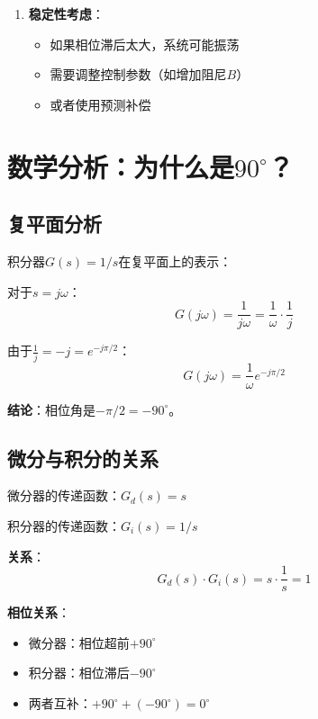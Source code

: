 \documentclass[12pt,a4paper]{article}
\begin{document}
\begin{enumerate}
\begin{enumerate}
\item \textbf{稳定性考虑}：
\begin{itemize}
\item 如果相位滞后太大，系统可能振荡
\item 需要调整控制参数（如增加阻尼$B$）
\item 或者使用预测补偿
\end{itemize}
\end{enumerate}

\section{数学分析：为什么是$90^\circ$？}

\subsection{复平面分析}

积分器$G(s) = 1/s$在复平面上的表示：

对于$s = j\omega$：
\begin{equation}
G(j\omega) = \frac{1}{j\omega} = \frac{1}{\omega} \cdot \frac{1}{j}
\end{equation}

由于$\frac{1}{j} = -j = e^{-j\pi/2}$：
\begin{equation}
G(j\omega) = \frac{1}{\omega} e^{-j\pi/2}
\end{equation}

\textbf{结论}：相位角是$-\pi/2 = -90^\circ$。

\subsection{微分与积分的关系}

微分器的传递函数：$G_d(s) = s$

积分器的传递函数：$G_i(s) = 1/s$

\textbf{关系}：
\begin{equation}
G_d(s) \cdot G_i(s) = s \cdot \frac{1}{s} = 1
\end{equation}

\textbf{相位关系}：
\begin{itemize}
\item 微分器：相位超前$+90^\circ$
\item 积分器：相位滞后$-90^\circ$
\item 两者互补：$+90^\circ + (-90^\circ) = 0^\circ$
\end{itemize}


\end{enumerate}
\end{document}

